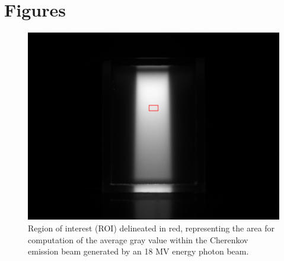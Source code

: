 \documentclass[12pt,french]{article}
\begin{document}
\pagestyle{plain}
\resumeanglais
\section*{Figures}
\begin{figure}[!htb]
    \centering
    \includegraphics[width=1\linewidth]{image_with_rectangle.png}
    \captionsetup{width=1\linewidth}
    \caption{Region of interest (ROI) delineated in red, representing the area for computation of the average gray value within the Cherenkov emission beam generated by an 18 MV energy photon beam.}
    \label{fig:ROI}
\end{figure}
\printbibliography
\end{document}
